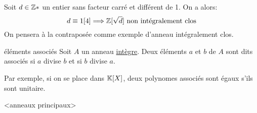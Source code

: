 \begin{example}{}{}
    Soit $d \in \mathbb{Z}*$ un entier sans facteur carré et différent de 1. On a alors:
    \[ d \equiv 1 [4] \Longrightarrow \mathbb{Z}[\sqrt{d}] ~ \text{non intégralement clos} \]
    On pensera à la contraposée comme exemple d'anneau intégralement clos.
\end{example}



\newpage

\begin{definition}{éléments associés}{}
    Soit $A$ un anneau \underline{intègre}.
    Deux éléments $a$ et $b$ de $A$ sont dits associés si $a$ divise $b$ et si $b$ divise $a$.
\end{definition}

Par exemple, si on se place dans $\mathbb{K}[X]$, deux polynomes associés sont égaux s'ils sont unitaire.

<anneaux principaux>